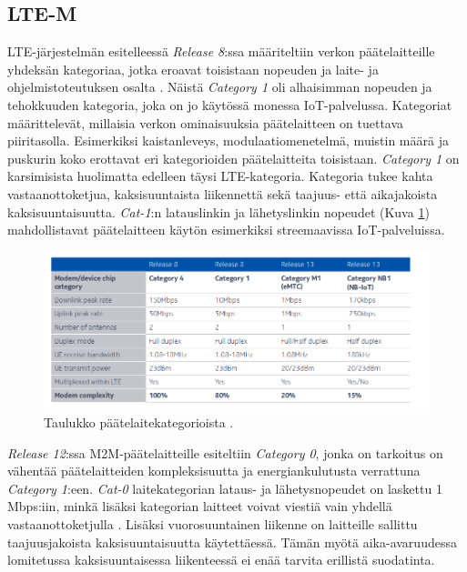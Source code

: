 \documentclass[finnish,12pt,a4paper,pdftex]{article}
\begin{document}
\subsection{LTE-M}

LTE-järjestelmän esitelleessä \textit{Release 8}:ssa määriteltiin verkon päätelaitteille yhdeksän kategoriaa, jotka eroavat toisistaan nopeuden ja laite- ja ohjelmistoteutuksen osalta \cite{release8}. Näistä \textit{Category 1} oli alhaisimman nopeuden ja tehokkuuden kategoria, joka on jo käytössä monessa IoT-palvelussa. Kategoriat määrittelevät, millaisia verkon ominaisuuksia päätelaitteen on tuettava piiritasolla. Esimerkiksi kaistanleveys, modulaatiomenetelmä, muistin määrä ja puskurin koko erottavat eri kategorioiden päätelaitteita toisistaan. \textit{Category 1} on karsimisista huolimatta edelleen täysi LTE-kategoria. Kategoria tukee kahta vastaanottoketjua, kaksisuuntaista liikennettä sekä taajuus- että aikajakoista kaksisuuntaisuutta. \cite{gsmawhitepaper} \textit{Cat-1}:n latauslinkin ja lähetyslinkin nopeudet (Kuva \ref{fig:kategoria}) mahdollistavat päätelaitteen käytön esimerkiksi streemaavissa IoT-palveluissa.
~\begin{figure}[h!]
    \centering
    \includegraphics[width=\linewidth]{Images/Kategoriat.png}
    \caption{Taulukko päätelaitekategorioista \cite{nokiawhitepaper}.}
    \label{fig:kategoria}
\end{figure}

 \textit{Release 12}:ssa \cite{release12} M2M-päätelaitteille esiteltiin \textit{Category 0}, jonka on tarkoitus on vähentää päätelaitteiden kompleksisuutta ja energiankulutusta verrattuna \textit{Category 1}:een. \textit{Cat-0} laitekategorian lataus- ja lähetysnopeudet on laskettu 1 Mbps:iin, minkä lisäksi kategorian laitteet voivat viestiä vain yhdellä vastaanottoketjulla \cite{gsmawhitepaper}. Lisäksi vuorosuuntainen liikenne on laitteille sallittu taajuusjakoista kaksisuuntaisuutta käytettäessä. Tämän myötä aika-avaruudessa lomitetussa kaksisuuntaisessa liikenteessä ei enää tarvita erillistä suodatinta.
\end{document}
